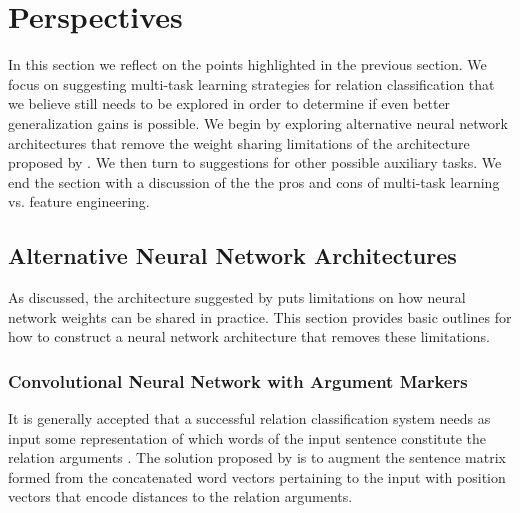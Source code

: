 \chapter{Perspectives}
In this section we reflect on the points highlighted in the previous section. We focus on suggesting multi-task learning strategies for relation classification that we believe still needs to be explored in order to determine if even better generalization gains is possible. We begin by exploring alternative neural network architectures that remove the weight sharing limitations of the architecture proposed by \citet{nguyen2015}. We then turn to suggestions for other possible auxiliary tasks. We end the section with a discussion of the the pros and cons of multi-task learning vs. feature engineering.

\section{Alternative Neural Network Architectures}
As discussed, the architecture suggested by \citet{nguyen2015} puts limitations on how neural network weights can be shared in practice. This section provides basic outlines for how to construct a neural network architecture that removes these limitations.

\subsection{Convolutional Neural Network with Argument Markers}
\label{marker_strategy}
It is generally accepted that a successful relation classification system needs as input some representation of which words of the input sentence constitute the relation arguments \citep{nguyen2015, zhang2015, jiang2009}. The solution proposed by \citet{nguyen2015} is to augment the sentence matrix formed from the concatenated word vectors pertaining to the input with position vectors that encode distances to the relation arguments. 

